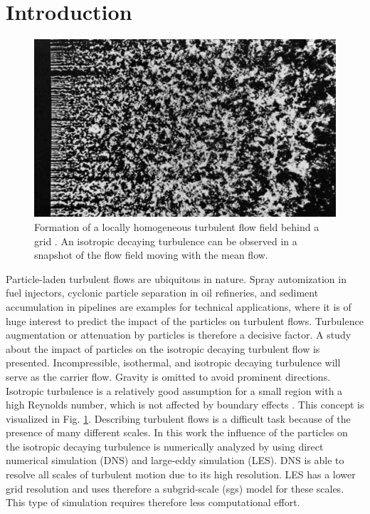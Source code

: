 \documentclass[11pt,a4paper,openany,oneside,parskip=half*]{article}
\begin{document}
\section{Introduction}
\setcounter{page}{1}
\begin{figure}[h]
	\centering
  \includegraphics[width=\textwidth]{./Abbildungen/TurbulentMotion_Introduction.png}
  \captionsetup{width=0.97\linewidth}
	\caption{Formation of a locally homogeneous turbulent flow field behind a grid \cite{albumOfFluidMotion}. An isotropic decaying turbulence can be observed in a snapshot of the flow field moving with the mean flow.}
	\label{introduction_picture}
\end{figure}
Particle-laden turbulent flows are ubiquitous in nature.
Spray automization in fuel injectors, cyclonic particle separation in oil refineries, and sediment accumulation in pipelines are examples for technical applications, where it is of huge interest to predict the impact of the particles on turbulent flows.
Turbulence augmentation or attenuation by particles is therefore a decisive factor.
\newline
A study about the impact of particles on the isotropic decaying turbulent flow is presented.
Incompressible, isothermal, and isotropic decaying turbulence will serve as the carrier flow. Gravity is omitted to avoid prominent directions. Isotropic turbulence is a relatively good assumption for a small region with a high Reynolds number, which is not affected by boundary effects \cite{Kolmogorov1941}. This concept is visualized in Fig. \ref{introduction_picture}. Describing turbulent flows is a difficult task because of the presence of many different scales.
\newline
In this work the influence of the particles on the isotropic decaying turbulence is numerically analyzed by using direct numerical simulation (DNS) and large-eddy simulation (LES). DNS is able to resolve all scales of turbulent motion due to its high resolution. LES has a lower grid resolution and uses therefore a subgrid-scale (sgs) model for these scales. This type of simulation requires therefore less computational effort.
\end{document}
